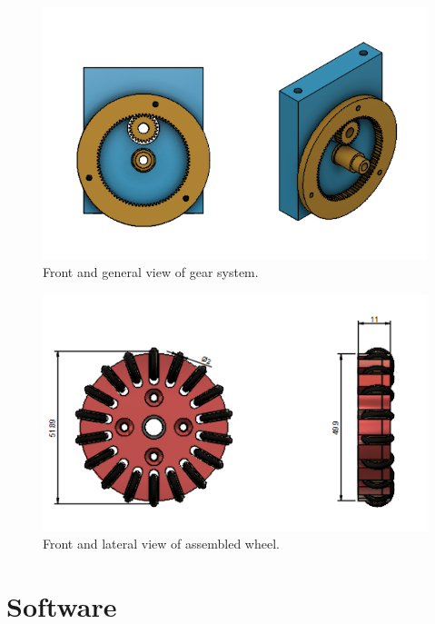 \documentclass{llncs}
\begin{document}
\begin{figure}[H]
    \centering
    \includegraphics[scale=0.6]{Images/Engranaje.jpeg}
    \caption{Front and general view of gear system. }
    \label{fig:Wheel1}
\end{figure}

\begin{figure}[h]
    \centering
    \includegraphics[scale=0.6]{Images/Wheel.jpeg}
    \caption{Front and lateral view of assembled wheel. }
    \label{fig:Wheel2}
\end{figure}

\section{Software}
\end{document}
